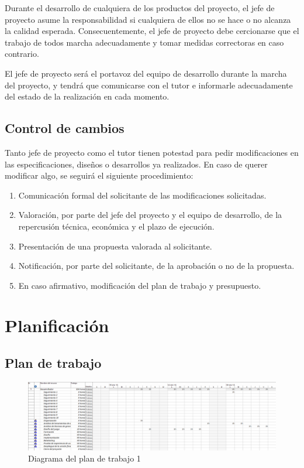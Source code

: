 			Durante el desarrollo de cualquiera de los productos del proyecto, el jefe de proyecto asume 	la responsabilidad si cualquiera de ellos no se hace o no alcanza la calidad esperada. 	Consecuentemente, el jefe de proyecto debe cercionarse que el trabajo de todos marcha 	adecuadamente y tomar medidas correctoras en caso contrario.

			El jefe de proyecto será el portavoz del equipo de desarrollo durante la marcha del proyecto, 	y tendrá que comunicarse con el tutor e informarle adecuadamente del estado de la 	realización en cada momento.

		\subsection{Control de cambios}

			Tanto jefe de proyecto como el tutor tienen potestad para pedir modificaciones en las 	especificaciones, diseños o desarrollos ya realizados. En caso de querer modificar algo, se 	seguirá el siguiente procedimiento:

			\begin{enumerate}
				\item Comunicación formal del solicitante de las modificaciones solicitadas.
				\item Valoración, por parte del jefe del proyecto y el equipo de desarrollo, de la repercusión 	técnica, económica y el plazo de ejecución.
				\item Presentación de una propuesta valorada al solicitante.
				\item Notificación, por parte del solicitante, de la aprobación o no de la propuesta.
				\item En caso afirmativo, modificación del plan de trabajo y presupuesto.
			\end{enumerate}

	\section{Planificación}

		\subsection{Plan de trabajo}

			\begin{figure}[!htp]
				\centering
				\includegraphics[page=1, scale=.5, angle=90]{fig/Plan1}
				\caption{Diagrama del plan de trabajo 1}
			\end{figure}

